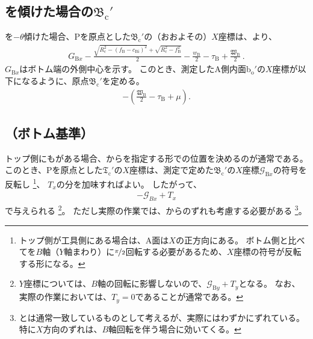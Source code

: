 \subsection[\Table を傾けた場合の\texorpdfstring{$\mathfrak B_\mathrm c'$}{Bc'}]
           {\Table を傾けた場合の$\boldsymbol{\mathfrak B_\mathrm c'}$}
\Table を$-\theta$傾けた場合、\TableCenter Pを原点とした\BottomOutcutCenter$\mathfrak B_\mathrm c'$の（おおよその）$X$座標は、より、
\begin{align}
  \label{eq:gaisakucenterBt}
  G_{\mathrm Bx}-\frac{\sqrt{R_\mathrm c^2-(f_\mathrm B-c_\mathrm{Bi})^2}+\sqrt{R_\mathrm c^2-f_\mathrm B^2}}2
  -\frac{w_\mathrm B}2-\tau_\mathrm B+\frac{\mathfrak W_\mathrm B}2\ .
\end{align}
$G_{\mathrm Bx}$はボトム端の外側中心を示す。
このとき、測定したA側内面b$_\mathrm o'$の$X$座標が以下になるように、原点$\mathfrak B_\mathrm c'$を定める。
\begin{align}
  \label{eq:gaisakucenterBr}
  -\left(\frac{\mathfrak W_\mathrm B}2-\tau_\mathrm B+\mu\right).
\end{align}


\subsection{\TopOutcutCenter（ボトム基準）}
\expandafterindex{\yomiTopOutcut@\nameTopOutcut}トップ側にも\nameOutcut がある場合、\BottomOutcutCenter から\CenterlineEndFaceDif を指定する形で\TopOutcutCenter の位置を決めるのが通常である。
このとき、\TableCenter Pを原点とした\TopOutcutCenter$\mathfrak T_\mathrm c'$の$X$座標は、測定で定めた$\mathfrak B_\mathrm c'$の$X$座標$\mathcal G_{\mathrm Bx}$の符号を反転し
\footnote{トップ側が工具側にある場合は、A面は$X$の正方向にある。
ボトム側と比べて\Table を$B$軸（$Y$軸まわり）に$\nicefrac\pi2$回転する必要があるため、$X$座標の符号が反転する形になる。}、
\CenterlineEndFaceDifAC$T_x$の分を加味すればよい。
したがって、
\begin{align}
  \label{eq:BbasedTx}
  -\mathcal G_{Bx}+T_x
\end{align}
で与えられる
\footnote{$Y$座標については、$B$軸の回転に影響しないので、$\mathcal G_{\mathrm By}+T_y$となる。
なお、実際の作業においては、$T_y = 0$であることが通常である。}。
ただし実際の作業では、\TableCenter からのずれも考慮する必要がある
\footnote{\TableCenter と\JigCenter は通常一致しているものとして考えるが、実際にはわずかにずれている。
特に$X$方向のずれは、$B$軸回転を伴う場合に効いてくる。}。




